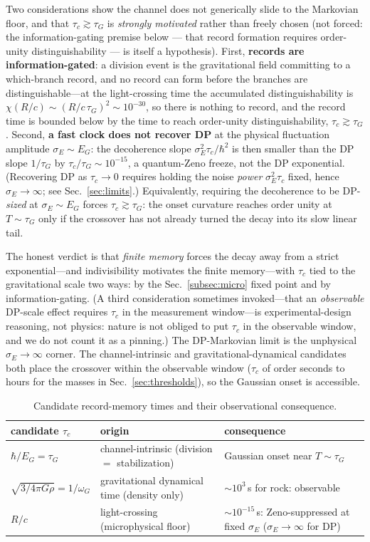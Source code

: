 \documentclass[aps,prd,onecolumn,amsmath,amssymb,nofootinbib,superscriptaddress]{revtex4-2}
\begin{document}
Two considerations show the channel does not generically slide to the Markovian floor, and that
$\tau_c\gtrsim\tau_G$ is \emph{strongly motivated} rather than freely chosen (not forced: the
information-gating premise below --- that record formation requires order-unity distinguishability ---
is itself a hypothesis). First, \textbf{records are information-gated}:
a division event is the gravitational field committing to a which-branch record, and no record can form
before the branches are distinguishable---at the light-crossing time the accumulated distinguishability
is $\chi(R/c)\sim(R/c\,\tau_G)^2\sim10^{-30}$, so there is nothing to record, and the record time is
bounded below by the time to reach order-unity distinguishability, $\tau_c\gtrsim\tau_G$. Second,
\textbf{a fast clock does not recover DP} at the physical fluctuation amplitude $\sigma_E\sim E_G$: the
decoherence slope $\sigma_E^2\tau_c/\hbar^2$ is then smaller than the DP slope $1/\tau_G$ by
$\tau_c/\tau_G\sim10^{-15}$, a quantum-Zeno freeze, not the DP exponential. (Recovering DP as
$\tau_c\to0$ requires holding the noise \emph{power} $\sigma_E^2\tau_c$ fixed, hence
$\sigma_E\to\infty$; see Sec.~\ref{sec:limits}.) Equivalently, requiring the decoherence to be
DP-\emph{sized} at $\sigma_E\sim E_G$ forces $\tau_c\gtrsim\tau_G$: the onset curvature reaches order
unity at $T\sim\tau_G$ only if the crossover has not already turned the decay into its slow linear tail.

The honest verdict is that \emph{finite memory} forces the decay away from a strict exponential---and
indivisibility motivates the finite memory---with $\tau_c$ tied to the gravitational scale two
ways: by the Sec.~\ref{subsec:micro} fixed point and by information-gating.  (A third consideration
sometimes invoked---that an \emph{observable} DP-scale effect requires $\tau_c$ in the measurement
window---is experimental-design reasoning, not physics: nature is not obliged to put $\tau_c$ in the
observable window, and we do not count it as a pinning.) The DP-Markovian limit is the unphysical $\sigma_E\to\infty$ corner. The
channel-intrinsic and gravitational-dynamical candidates both place the crossover within the observable
window ($\tau_c$ of order seconds to hours for the masses in Sec.~\ref{sec:thresholds}), so the
Gaussian onset is accessible.

\begin{table}[h]
\centering
\caption{Candidate record-memory times and their observational consequence.}\label{tab:tauc}
\begin{tabular}{lll}
\hline\hline
candidate $\tau_c$ & origin & consequence \\
\hline
$\hbar/E_G=\tau_G$ & channel-intrinsic (division $=$ stabilization) & Gaussian onset near $T\sim\tau_G$ \\
$\sqrt{3/4\pi G\rho}=1/\omega_G$ & gravitational dynamical time (density only) & $\sim10^3\,$s for rock: observable \\
$R/c$ & light-crossing (microphysical floor) & $\sim10^{-15}\,$s: Zeno-suppressed at fixed $\sigma_E$ ($\sigma_E\!\to\!\infty$ for DP) \\
\hline\hline
\end{tabular}
\end{table}
\end{document}
